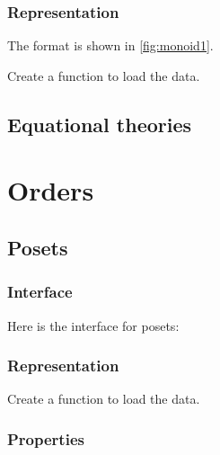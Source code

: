 
\subsection*{Representation}

The format is shown in \cref{fig:monoid1}.



\begin{exercise}[Representation]
  Create a function to load the data.


%

\end{exercise}


\section{Equational theories}



\chapter{Orders}


\section{Posets}

\subsection*{Interface}

Here is the interface for posets:

%

\subsection*{Representation}


\begin{exercise}[Representation]
  Create a function to load the data.


%

\end{exercise}

\subsection{Properties}



